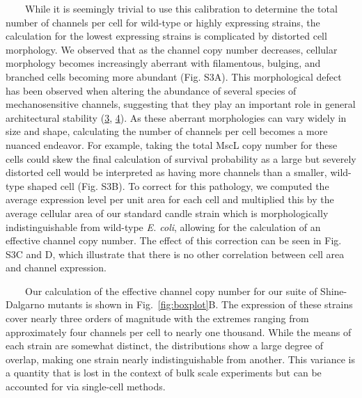 ~~~~While
it is
seemingly
trivial
to use
this
calibration
to
determine
the
total
number
of
channels
per
cell
for
wild-type
or
highly
expressing
strains,
the
calculation
for
the
lowest
expressing
strains
is
complicated
by
distorted
cell
morphology.
We
observed
that
as the
channel
copy
number
decreases,
cellular
morphology
becomes
increasingly
aberrant
with
filamentous,
bulging,
and
branched
cells
becoming
more
abundant
(Fig.
S3A).
This
morphological
defect
has
been
observed
when
altering
the
abundance
of
several
species
of
mechanosensitive
channels,
suggesting
that
they
play
an
important
role
in
general
architectural
stability
(\protect\hyperlink{ref-bialecka-fornal2012}{3},
\protect\hyperlink{ref-bialecka-fornal2015}{4}).
As
these
aberrant
morphologies
can
vary
widely
in
size
and
shape,
calculating
the
number
of
channels
per
cell
becomes
a more
nuanced
endeavor.
For
example,
taking
the
total
MscL
copy
number
for
these
cells
could
skew
the
final
calculation
of
survival
probability
as a
large
but
severely
distorted
cell
would
be
interpreted
as
having
more
channels
than a
smaller,
wild-type
shaped
cell
(Fig.
S3B).
To
correct
for
this
pathology,
we
computed
the
average
expression
level
per
unit
area
for
each
cell
and
multiplied
this
by the
average
cellular
area
of our
standard
candle
strain
which
is
morphologically
indistinguishable
from
wild-type
\emph{E.
coli},
allowing
for
the
calculation
of an
effective
channel
copy
number.
The
effect
of
this
correction
can be
seen
in
Fig.
S3C
and D,
which
illustrate
that
there
is no
other
correlation
between
cell
area
and
channel
expression.

~~~~Our
calculation
of the
effective
channel
copy
number
for
our
suite
of
Shine-Dalgarno
mutants
is
shown
in
Fig.~\ref{fig:boxplot}B.
The
expression
of
these
strains
cover
nearly
three
orders
of
magnitude
with
the
extremes
ranging
from
approximately
four
channels
per
cell
to
nearly
one
thousand.
While
the
means
of
each
strain
are
somewhat
distinct,
the
distributions
show a
large
degree
of
overlap,
making
one
strain
nearly
indistinguishable
from
another.
This
variance
is a
quantity
that
is
lost
in the
context
of
bulk
scale
experiments
but
can be
accounted
for
via
single-cell
methods.

